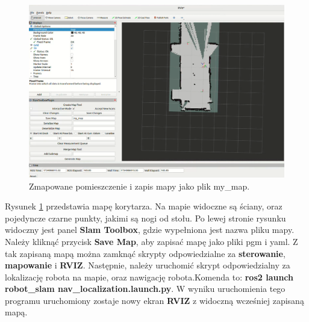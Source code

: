 \documentclass[a4paper,twoside,12pt]{book}
\begin{document}
\begin{figure}[!hb]
	\centering
	\includegraphics[width=1\textwidth]{images/save-map.png}
	\caption{Zmapowane pomieszczenie i zapis mapy jako plik my\_map.}
	\label{fig:save-map}
\end{figure}
Rysunek \ref{fig:save-map} przedstawia mapę korytarza. Na mapie widoczne są ściany, oraz pojedyncze czarne punkty, jakimi są nogi od stołu. Po lewej stronie rysunku widoczny jest panel \textbf{Slam Toolbox}, gdzie wypełniona jest nazwa pliku mapy. Należy kliknąć przycisk \textbf{Save Map}, aby zapisać mapę jako pliki pgm i yaml.
\newpage
Z tak zapisaną mapą można zamknąć skrypty odpowiedzialne za \textbf{sterowanie}, \textbf{mapowanie} i \textbf{RVIZ}.
\newline\newline
Następnie, należy uruchomić skrypt odpowiedzialny za lokalizację robota na mapie, oraz nawigację robota.\newline Komenda to: \textbf{ros2 launch robot\_slam nav\_localization.launch.py}. 
W wyniku uruchomienia tego programu uruchomiony zostaje nowy ekran \textbf{RVIZ} z widoczną wcześniej zapisaną mapą.
\end{document}
